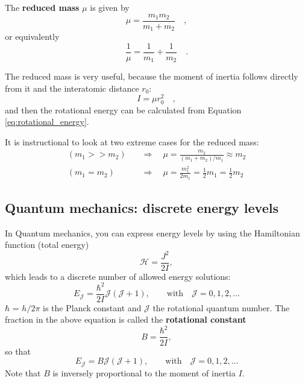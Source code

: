 The \textbf{reduced mass} $\mu$ is given by
\begin{equation}
\mu = \frac{m_1 m_2}{m_1+m_2} \quad ,
\end{equation}
or equivalently
\begin{equation}
\frac{1}{\mu} = \frac{1}{m_1} + \frac{1}{m_2} \quad .
\end{equation}

The reduced mass is very useful, because the moment of inertia follows
directly from it and the interatomic distance $r_0$:
\begin{equation}
I = \mu r_0^2 \quad ,
\end{equation}
and then the rotational energy can be calculated from Equation \ref{eq:rotational_energy}. 

It is instructional to look at two extreme cases for the reduced
mass:
\begin{align}
(m_1 >> m_2) \quad &\Rightarrow \quad \mu = \frac{m_2}{(m_1 + m_2)/m_1} \approx  m_2 \\
(m_1 = m_2)  \quad &\Rightarrow \quad \mu = \frac{m_1^2}{2m_1} = \frac{1}{2}m_1 = \frac{1}{2}m_2
\end{align}


\subsection{Quantum mechanics: discrete energy levels}

In Quantum mechanics, you can express energy levels by using the Hamiltonian function (total energy)
\begin{equation}
\mathcal{H}=\frac{J^2}{2I},
\end{equation}
which leads to a discrete number of allowed energy solutions:
\begin{equation}
E_\mathcal{J} = \frac{\hbar^2}{2I} \mathcal{J}(\mathcal{J}+1), \qquad \text{with} \quad \mathcal{J} = 0, 1, 2, ...
\end{equation}
$\hbar$ = $h/2\pi$ is the Planck constant and $\mathcal{J}$ the
rotational quantum number. The fraction in the above equation is
called the \textbf{rotational constant} 
\begin{equation}
  B = \frac{\hbar^2}{2I}  ,
\end{equation}
so that
\begin{equation}
E_\mathcal{J} = B \mathcal{J}(\mathcal{J}+1), \qquad \text{with} \quad \mathcal{J} = 0, 1, 2, ...
\end{equation}
Note that $B$ is inversely proportional to the moment of inertia $I$.

